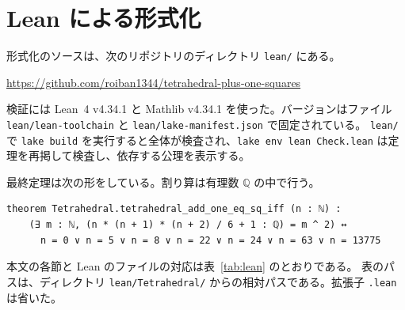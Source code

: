 \documentclass[a4paper,11pt]{ltjsarticle}
\theoremstyle{jplain}
\numberwithin{equation}{section}
\numberwithin{table}{section}
\newcommand{\Q}{\mathbb{Q}}
\begin{document}
\appendix
\makeatletter\gdef{}\makeatother
\section{Lean による形式化}\label{app:lean}

形式化のソースは、次のリポジトリのディレクトリ \texttt{lean/} にある。
\begin{center}
\url{https://github.com/roiban1344/tetrahedral-plus-one-squares}
\end{center}
検証には Lean~4 v4.34.1 と Mathlib v4.34.1 を使った。バージョンはファイル \texttt{lean/lean-toolchain} と \texttt{lean/lake-manifest.json} で固定されている。
\texttt{lean/} で \texttt{lake build} を実行すると全体が検査され、\texttt{lake env lean Check.lean} は定理を再掲して検査し、依存する公理を表示する。

最終定理は次の形をしている。割り算は有理数 $\Q$ の中で行う。
\begin{verbatim}
theorem Tetrahedral.tetrahedral_add_one_eq_sq_iff (n : ℕ) :
    (∃ m : ℕ, (n * (n + 1) * (n + 2) / 6 + 1 : ℚ) = m ^ 2) ↔
      n = 0 ∨ n = 5 ∨ n = 8 ∨ n = 22 ∨ n = 24 ∨ n = 63 ∨ n = 13775
\end{verbatim}

本文の各節と Lean のファイルの対応は表~\ref{tab:lean} のとおりである。
表のパスは、ディレクトリ \texttt{lean/Tetrahedral/} からの相対パスである。拡張子 \texttt{.lean} は省いた。
\end{document}
